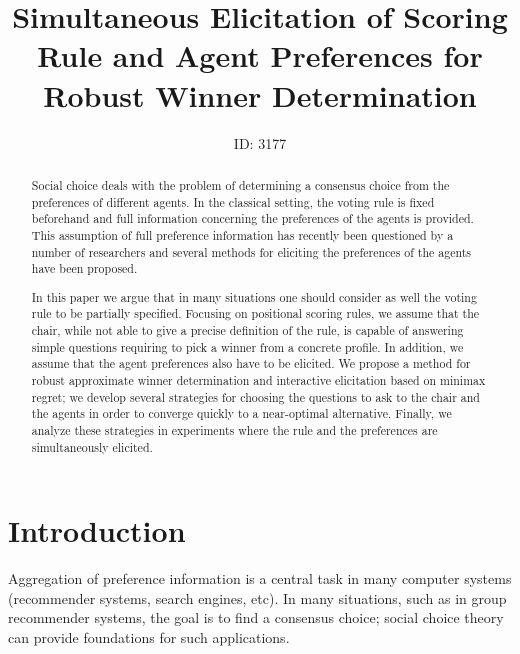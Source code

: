 \documentclass{article}
\title{Simultaneous Elicitation of Scoring Rule and Agent Preferences for Robust Winner Determination}
\author{ID: 3177}
\begin{document}
\maketitle 

\begin{abstract}
Social choice deals with the problem of determining a consensus choice from the preferences of different agents.
In the classical setting, the voting rule is fixed beforehand and full information concerning the preferences of the agents is provided.
This assumption of full preference information has recently been questioned by a number of researchers and
	several methods for eliciting the preferences of the agents have been proposed.

In this paper we argue that in many situations one should consider as well the voting rule to be 	partially specified.
	Focusing on positional scoring rules, we assume that the chair, while not able to give a precise definition of the rule, is capable of answering simple questions requiring to pick a winner from a concrete profile. In addition, we assume that the agent preferences also have to be elicited. %
	We propose a method for robust approximate winner determination and interactive elicitation based on minimax regret; we develop several strategies for choosing the questions to ask to  the chair and the agents in order to %
converge quickly to a near-optimal alternative. Finally, we analyze these strategies in experiments %
 where the  rule and the preferences are simultaneously elicited.
\end{abstract}

\section{Introduction}
Aggregation of preference information is a central task in many computer systems (recommender systems, search engines, etc).
In many situations, such as in group recommender systems, the goal is to find a consensus choice;
social choice theory can provide foundations for such applications.
\end{document}
